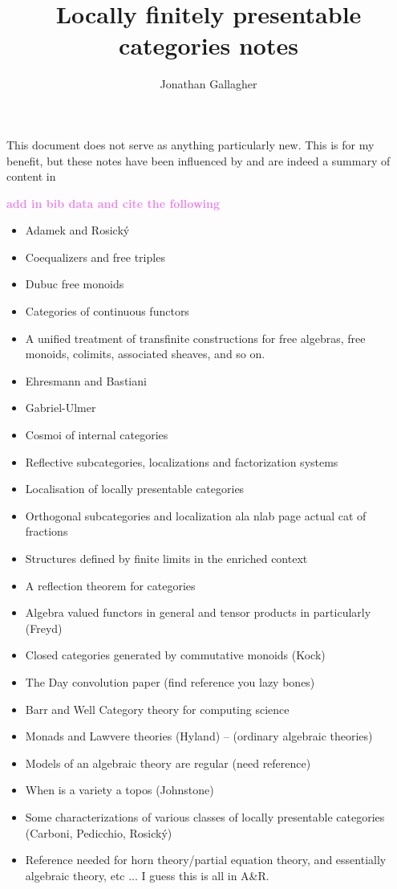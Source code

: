\documentclass{article}
\title{Locally finitely presentable categories notes}
\author{Jonathan Gallagher}
\newcommand{\<}{\left\langle}
\renewcommand{\>}{\right\rangle}
\begin{document}
\maketitle

This document does not serve as anything particularly new.  This is for my benefit,
but these notes have been influenced by and are indeed a summary of content in 

\textcolor{violet}{\bf add in bib data and cite the following}
\begin{itemize}
    \item Adamek and Rosick\'{y} 
    \item Coequalizers and free triples
    \item  Dubuc free monoids
    \item Categories of continuous functors
    \item A unified treatment of transfinite constructions for free algebras, free monoids, colimits, associated sheaves, and so on.
    \item Ehresmann and Bastiani
    \item Gabriel-Ulmer
    \item Cosmoi of internal categories
    \item Reflective subcategories, localizations and factorization systems
    \item Localisation of locally presentable categories
    \item Orthogonal subcategories and localization ala nlab page actual cat of fractions
    \item Structures defined by finite limits in the enriched context
    \item A reflection theorem for categories
    \item Algebra valued functors in general and tensor products in particularly (Freyd)
    \item Closed categories generated by commutative monoids (Kock)
    \item The Day convolution paper (find reference you lazy bones)
    \item Barr and Well Category theory for computing science
    \item Monads and Lawvere theories (Hyland) -- (ordinary algebraic theories)
    \item Models of an algebraic theory are regular (need reference)
    \item When is a variety a topos (Johnstone)
    \item Some characterizations of various classes of locally presentable categories (Carboni, Pedicchio, Rosick\'{y})
    \item Reference needed for horn theory/partial equation theory, and essentially algebraic theory, etc ... I guess this is all in A\&R.
\end{itemize}
\end{document}
